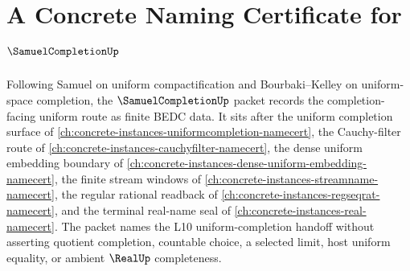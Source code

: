 \chapter{A Concrete Naming Certificate for $\SamuelCompletionUp$}
\label{ch:concrete-instances-samuel-completion-namecert}

Following Samuel on uniform compactification and Bourbaki--Kelley on uniform-space completion, the $\SamuelCompletionUp$ packet records the completion-facing uniform route as finite BEDC data. It sits after the uniform completion surface of \autoref{ch:concrete-instances-uniformcompletion-namecert}, the Cauchy-filter route of \autoref{ch:concrete-instances-cauchyfilter-namecert}, the dense uniform embedding boundary of \autoref{ch:concrete-instances-dense-uniform-embedding-namecert}, the finite stream windows of \autoref{ch:concrete-instances-streamname-namecert}, the regular rational readback of \autoref{ch:concrete-instances-regseqrat-namecert}, and the terminal real-name seal of \autoref{ch:concrete-instances-real-namecert}. The packet names the L10 uniform-completion handoff without asserting quotient completion, countable choice, a selected limit, host uniform equality, or ambient $\RealUp$ completeness.


